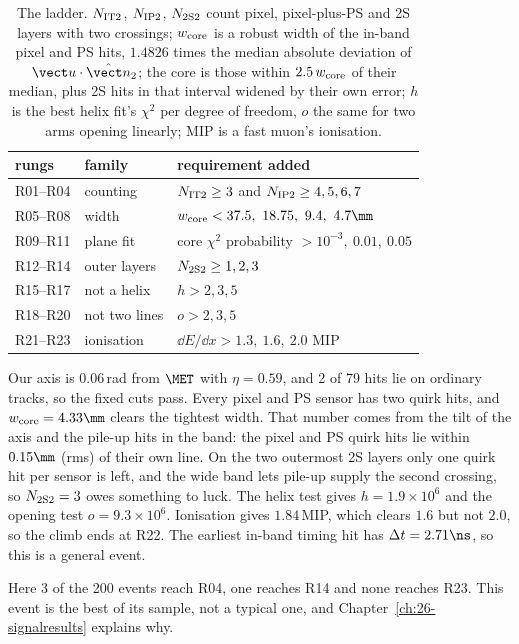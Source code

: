 \begin{table}
  \caption{The ladder. $N_{\rm IT2}$, $N_{\rm IP2}$, $N_{\rm 2S2}$ count pixel, pixel-plus-PS and 2S layers with two
  crossings; $w_{\rm core}$ is a robust width of the in-band pixel and PS hits, $1.4826$ times the median absolute deviation of $\vect u\cdot\hat{\vect n}_2$; the core is those within $2.5\,w_{\rm core}$ of their median, plus 2S hits in that interval widened by their own error; $h$ is the best helix fit's $\chi^2$ per degree of freedom, $o$ the
  same for two arms opening linearly; MIP is a fast muon's ionisation.}
  \label{tab:25-ladder}
  \small
  \begin{tabular}{lll}
    \toprule
    rungs & family & requirement added\\
    \midrule
    R01--R04 & counting & $N_{\rm IT2}\ge3$ and $N_{\rm IP2}\ge4,5,6,7$\\
    R05--R08 & width & $w_{\rm core}<37.5,\ 18.75,\ 9.4,\ 4.7\mm$\\
    R09--R11 & plane fit & core $\chi^2$ probability $>10^{-3},\ 0.01,\ 0.05$\\
    R12--R14 & outer layers & $N_{\rm 2S2}\ge1,2,3$\\
    R15--R17 & not a helix & $h>2,3,5$\\
    R18--R20 & not two lines & $o>2,3,5$\\
    R21--R23 & ionisation & $\dd E/\dd x>1.3,\ 1.6,\ 2.0$ MIP\\
    \bottomrule
  \end{tabular}
\end{table}

\begin{example}\label{exa:25-event}
Our axis is $0.06$\,rad from $\MET$ with $\eta=0.59$, and 2 of 79 hits lie on ordinary tracks, so the fixed cuts pass. Every pixel and PS
sensor has two quirk hits, and $w_{\rm core}=4.33\mm$ clears the tightest width. That number comes from the tilt of the axis and the pile-up hits in the band: the pixel and PS quirk hits lie within $0.15\mm$ (rms) of their own line. On the two outermost 2S layers only one quirk hit per sensor
is left, and the wide band lets pile-up supply the second crossing, so $N_{\rm 2S2}=3$ owes something to luck. The helix test gives
$h=1.9\times10^6$ and the opening test $o=9.3\times10^6$. Ionisation gives $1.84$\,MIP, which clears $1.6$ but not $2.0$, so the climb ends at
R22. The earliest in-band timing hit has $\Delta t=2.71\ns$, so this is a general event.

Here 3 of the 200 events reach R04, one reaches R14 and none reaches R23. This event is the best
of its sample, not a typical one, and Chapter~\ref{ch:26-signalresults} explains why.
\end{example}

